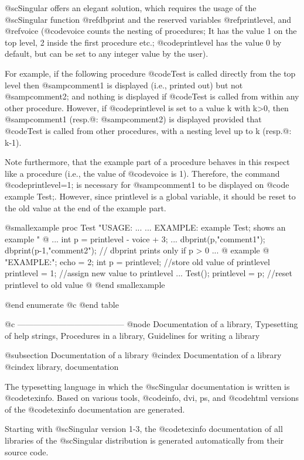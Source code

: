 {{{{@sc{Singular} offers an elegant solution, which requires the usage of
the @sc{Singular} function @ref{dbprint} and the reserved variables
@ref{printlevel}, and @ref{voice} (@code{voice} counts the nesting of
procedures; It has the value 1 on the top level, 2 inside the first
procedure etc.; @code{printlevel} has the value 0 by default, but can be
set to any integer value by the user).

For example, if the following procedure @code{Test} is called
directly from the top level then @samp{comment1} is displayed (i.e.,
printed out) but not
@samp{comment2}; and nothing is displayed if  @code{Test} is called
from within any other procedure.
However, if @code{printlevel} is set to  a value k with k>0, then
@samp{comment1} (resp.@: @samp{comment2}) is displayed provided that
@code{Test} is called from other procedures, with a nesting level up to
k (resp.@: k-1).

Note furthermore, that the example part of a procedure
behaves in this respect like a procedure (i.e., the value of @code{voice}
is 1). Therefore, the command @code{printlevel=1;} is necessary for
@samp{comment1} to be displayed on @code{ example Test;}. However,
since printlevel is a global variable, it should be reset to the old
value at the end of the example part.

@smallexample
proc Test
"USAGE:   ...
         ...
EXAMPLE: example Test; shows an example
"
@{   ...
   int p = printlevel - voice + 3;
    ...
   dbprint(p,"comment1");
   dbprint(p-1,"comment2");
   // dbprint prints only if p > 0
    ...
@}
example
@{ "EXAMPLE:"; echo = 2;
   int p = printlevel;   //store old value of printlevel
   printlevel = 1;       //assign new value to printlevel
    ...
   Test();
   printlevel = p;       //reset printlevel to old value
@}
@end smallexample

@end enumerate
@c @end table

@c ---------------------------------------
@node Documentation of a library, Typesetting of help strings, Procedures in a library, Guidelines for writing a library

@subsection Documentation of a library
@cindex Documentation of a library
@cindex library, documentation

The typesetting language in which the @sc{Singular} documentation is
written is @code{texinfo}. Based on various tools, @code{info, dvi, ps,} and
@code{html} versions of the @code{texinfo} documentation are generated.


Starting with @sc{Singular} version 1-3, the @code{texinfo}
documentation of all libraries of the @sc{Singular} distribution is
generated automatically from their source code.

}}}}
